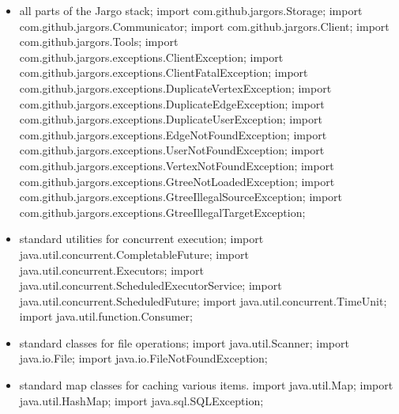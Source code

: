 \begin{itemize}
\item all parts of the Jargo stack;
\nwenddocs{}\plusendmoddef
import com.github.jargors.Storage;
import com.github.jargors.Communicator;
import com.github.jargors.Client;
import com.github.jargors.Tools;
import com.github.jargors.exceptions.ClientException;
import com.github.jargors.exceptions.ClientFatalException;
import com.github.jargors.exceptions.DuplicateVertexException;
import com.github.jargors.exceptions.DuplicateEdgeException;
import com.github.jargors.exceptions.DuplicateUserException;
import com.github.jargors.exceptions.EdgeNotFoundException;
import com.github.jargors.exceptions.UserNotFoundException;
import com.github.jargors.exceptions.VertexNotFoundException;
import com.github.jargors.exceptions.GtreeNotLoadedException;
import com.github.jargors.exceptions.GtreeIllegalSourceException;
import com.github.jargors.exceptions.GtreeIllegalTargetException;
\nwendcode{}\item standard utilities for concurrent execution;
\nwenddocs{}\plusendmoddef
import java.util.concurrent.CompletableFuture;
import java.util.concurrent.Executors;
import java.util.concurrent.ScheduledExecutorService;
import java.util.concurrent.ScheduledFuture;
import java.util.concurrent.TimeUnit;
import java.util.function.Consumer;
\nwendcode{}\item standard classes for file operations;
\nwenddocs{}\plusendmoddef
import java.util.Scanner;
import java.io.File;
import java.io.FileNotFoundException;
\nwendcode{}\item standard map classes for caching various items.
\nwenddocs{}\plusendmoddef
import java.util.Map;
import java.util.HashMap;
\nwendcode{}\nwdocspar
\nwenddocs{}\plusendmoddef
import java.sql.SQLException;
\nwendcode{}\nwdocspar
\end{itemize}

